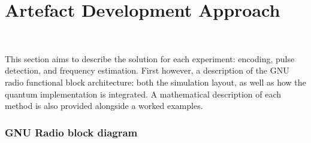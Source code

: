 \section{Artefact Development Approach}~\label{sec:approach}

This section aims to describe the solution for each experiment: encoding, pulse detection, and frequency estimation.
First however, a description of the GNU radio functional block architecture: both the simulation layout, as well as how the quantum implementation is integrated.
A mathematical description of each method is also provided alongside a worked examples.

\subsubsection{GNU Radio block diagram}


